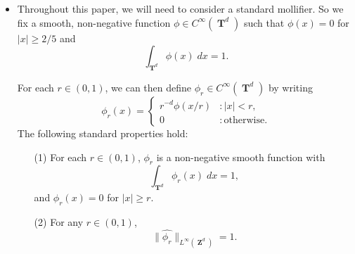 \documentclass[dvipsnames,letterpaper,12pt]{article}
\numberwithin{equation}{section}
\DeclareMathOperator{\ZZ}{\mathbf{Z}}
\DeclareMathOperator{\TT}{\mathbf{T}}
\newtheorem{theorem}{Theorem}
\numberwithin{theorem}{section}
\begin{document}
\begin{itemize}
    \item Throughout this paper, we will need to consider a standard mollifier. So we fix a smooth, non-negative function $\phi \in C^\infty(\TT^d)$ such that $\phi(x) = 0$ for $|x| \geq 2/5$ and
%
\[ \int_{\TT^d} \phi(x)\; dx = 1. \]
%
\begin{comment}
\begin{theorem} \label{equationASFGCISIX}
    There exists a smooth probability density $\phi \in C^\infty(\TT^d)$ such that $\phi(x) = 0$ for $|x| \geq 2/5$, and such that for each $x \in \TT^d$
    \[ \sum_{k \in \{ 0, 1 \}^d} \phi(x + k/2) = 2^d. \]
\end{theorem}
\begin{proof}
    Let $\psi$ be a non-negative smooth function on $\TT$ such that $\psi(x) = \psi(- x)$ for all $x \in \TT$, $\psi(x) = 1$ for $|x| \leq 1/10$, $\psi(x) = 0$ for $|x| \geq 2/10$, and $0 \leq \psi(x) \leq 1$ for all $x \in \TT$. Then define $\eta$ to be the non-negative, $C^\infty$ function
    \[ \eta(x) = \frac{1}{2} - \frac{\psi(x) + \psi(x + 1/2)}{2}. \]
    If we define
    \[ \phi_0(x) = 2(\psi(x) + \eta(x)), \]
    then $\phi_0(x) + \phi_0(x + 1/2) = 2$ for all $x \in \TT$. Moreover, if $|x| \geq 2/5$, then $\psi(x) = 0$, and since this implies $|x + 1/2| \leq 1/10$, we find $\eta(x) = 0$. Thus $\phi_0(x) = 0$ for $|x| \geq 2/5$. But the condition $\phi_0(x) + \phi_0(x + 1/2) = 2$ implies that $\phi_0$ is a probability density function. Thus it suffices to define
    \[ \phi(x_1, \dots, x_d) = \phi_0(x_1) \dots \phi_0(x_d). \qedhere \]
\end{proof}
\end{comment}
%
For each $r \in (0,1)$, we can then define $\phi_r \in C^\infty(\TT^d)$ by writing
%
\[ \phi_r(x) = \begin{cases} r^{-d} \phi(x/r) &: |x| < r, \\ 0 &: \text{otherwise}. \end{cases} \]
%
The following standard properties hold:
%
\begin{enumerate}
    \item[(1)] For each $r \in (0,1)$, $\phi_r$ is a non-negative smooth function with
    \begin{equation}
        \int_{\TT^d} \phi_r(x)\; dx = 1,
    \end{equation}
    and $\phi_r(x) = 0$ for $|x| \geq r$.

    \item[(2)] For any $r \in (0,1)$,
    \begin{equation} \label{equationDIOJAOIJVIV23242}
        \| \widehat{\phi_r} \|_{L^\infty(\ZZ^d)} = 1.
    \end{equation}


\end{enumerate}
\end{itemize}
\end{document}

